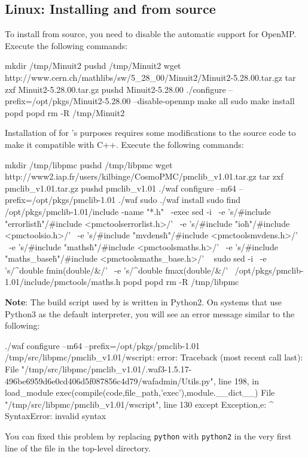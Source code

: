 \subsection{Linux: Installing  and  from source}

To install  from source, you need to disable the automatic support
for OpenMP. Execute the following commands:
\begin{commandline}
mkdir /tmp/Minuit2
pushd /tmp/Minuit2
wget http://www.cern.ch/mathlibs/sw/5_28_00/Minuit2/Minuit2-5.28.00.tar.gz
tar zxf Minuit2-5.28.00.tar.gz
pushd Minuit2-5.28.00
./configure --prefix=/opt/pkgs/Minuit2-5.28.00 --disable-openmp
make all
sudo make install
popd
popd
rm -R /tmp/Minuit2
\end{commandline}

Installation of  for \EOS's purposes requires some modifications
to the source code to make it compatible with C++. Execute the following
commands:
\begin{commandline}
mkdir /tmp/libpmc
pushd /tmp/libpmc
wget http://www2.iap.fr/users/kilbinge/CosmoPMC/pmclib_v1.01.tar.gz
tar zxf pmclib_v1.01.tar.gz
pushd pmclib_v1.01
./waf configure --m64 --prefix=/opt/pkgs/pmclib-1.01
./waf
sudo ./waf install
sudo find /opt/pkgs/pmclib-1.01/include -name "*.h" \
    -exec sed -i \
    -e 's/#include "errorlist\.h"/#include <pmctools\/errorlist.h>/' \
    -e 's/#include "io\.h"/#include <pmctools\/io.h>/' \
    -e 's/#include "mvdens\.h"/#include <pmctools\/mvdens.h>/' \
    -e 's/#include "maths\.h"/#include <pmctools\/maths.h>/' \
    -e 's/#include "maths_base\.h"/#include <pmctools\/maths_base.h>/' \
    {} \;
sudo sed -i \
    -e 's/^double fmin(double/\/\/&/' \
    -e 's/^double fmax(double/\/\/&/' \
    /opt/pkgs/pmclib-1.01/include/pmctools/maths.h
popd
popd
rm -R /tmp/libpmc
\end{commandline}

\textbf{Note}: The  build script used by  is written in Python2. On
systems that use Python3 as the default interpreter, you will see an error message similar
to the following:
\begin{file}
./waf configure --m64 --prefix=/opt/pkgs/pmclib-1.01
/tmp/src/libpmc/pmclib_v1.01/wscript: error: Traceback (most recent call last):
  File "/tmp/src/libpmc/pmclib_v1.01/.waf3-1.5.17-496be6959d6e0cd406d5f087856c4d79/wafadmin/Utils.py", line 198, in load_module
    exec(compile(code,file_path,'exec'),module.__dict__)
  File "/tmp/src/libpmc/pmclib_v1.01/wscript", line 130
    except Exception,e:
                    ^
SyntaxError: invalid syntax
\end{file}
You can fixed this problem by replacing \texttt{python} with \texttt{python2} in the very first
line of the file \filename{waf} in the top-level  directory.\\

